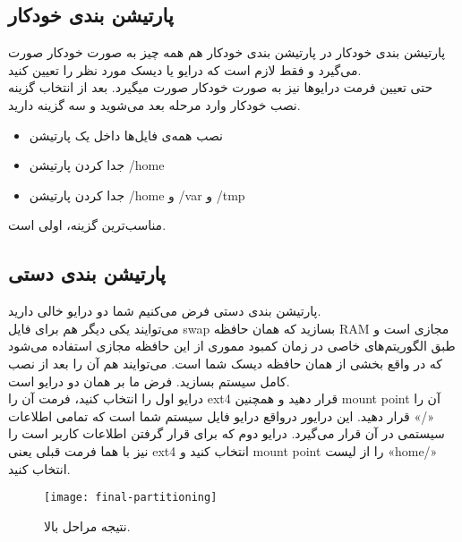 \subsection{پارتیشن بندی خودکار}
\begin{frame}{پارتیشن بندی خودکار}
  در پارتیشن بندی خودکار هم همه چیز به صورت خودکار صورت می‌گیرد و فقط لازم است که درایو یا دیسک مورد نظر را تعیین کنید.\\
  حتی تعیین فرمت درایوها نیز به صورت خودکار صورت میگیرد.
  بعد از انتخاب گزینه نصب خودکار وارد مرحله بعد می‌شوید و سه گزینه دارید.\\
  \begin{itemize}
    \item نصب همه‌ی فایل‌ها داخل یک پارتیشن
    \item جدا کردن پارتیشن /home
    \item جدا کردن پارتیشن /home و /var و /tmp
  \end{itemize}
  مناسب‌ترین گزینه، اولی است.
\end{frame}




\subsection{پارتیشن بندی دستی}
\begin{frame}{پارتیشن بندی دستی}
  فرض می‌کنیم شما دو درایو خالی دارید.\\ می‌توایند یکی دیگر هم برای فایل swap بسازید که همان حافظه RAM مجازی است و طبق الگوریتم‌های خاصی در زمان کمبود مموری از این حافظه مجازی استفاده می‌شود که در واقع بخشی از همان حافظه دیسک شما است. می‌توایند هم آن را بعد از نصب کامل سیستم بسازید.
  فرض ما بر همان دو درایو است.\\
  درایو اول را انتخاب کنید، فرمت آن را ext4 قرار دهید و همچنین mount point آن را «/» قرار دهید. این درایور درواقع درایو فایل سیستم شما است که تمامی اطلاعات سیستمی در آن قرار می‌گیرد.
  درایو دوم که برای قرار گرفتن اطلاعات کاربر است را نیز با هما فرمت قبلی یعنی ext4 انتخاب کنید و mount point را از لیست «home/» انتخاب کنید.\\
 \begin{figure}
    \texttt{[image: final-partitioning]}
    \caption{ نتیجه مراحل بالا.~\cite{fig:finish_partitioning}}
  \end{figure}
\end{frame}


